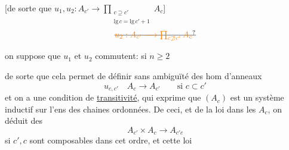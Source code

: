 [de sorte que $u_1,u_2:A_{c'}\longrightarrow\displaystyle\prod_{\substack{c\supseteq c'\\\mathrm{lg}\,c=\mathrm{lg}\,c'+1}}A_c$]
\[\deleted{\unsure{u_2:A_{c'}\longrightarrow\prod_{c\not\supset c'} A_c}}\]

on suppose que $u_1$ et $u_2$ commutent: si $n\geq2$

de sorte que cela permet de définir sans ambiguïté des hom d'anneaux
\[u_{c,c'}\quad A_c\longrightarrow A_{c'}\qquad\text{si }c\subset c'\]
\deleted{[\unsure{donc}} et on a une condition de \uline{transitivité}, qui exprime que $(A_c)$ est un système inductif sur l'ens des chaines ordonnées. De ceci, et de la loi \uline{} dans les $A_c$, on déduit des  
\[A_{c'}\times A_c\longrightarrow A_{c'c}\]
si $c',c$ sont composables dans cet ordre, et cette loi

